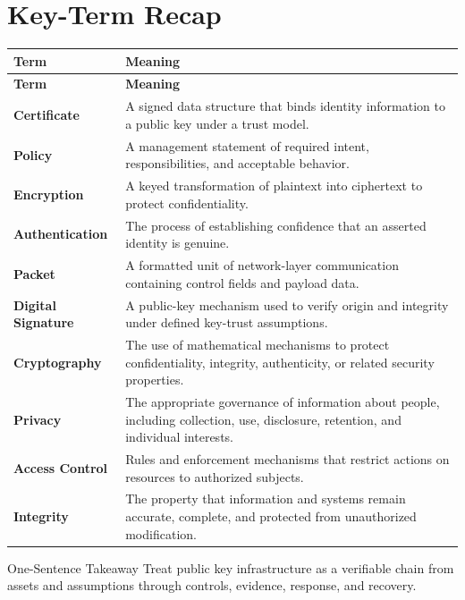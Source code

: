 \documentclass[11pt,letterpaper]{article}
\begin{document}
\section*{Key-Term Recap}
\begin{longtable}{>{\raggedright\arraybackslash}p{}>{\raggedright\arraybackslash}p{}}
\toprule\rowcolor{Navy}\color{white}\textbf{Term} & \color{white}\textbf{Meaning}\\\midrule
\endfirsthead
\toprule\rowcolor{Navy}\color{white}\textbf{Term} & \color{white}\textbf{Meaning}\\\midrule
\endhead
\textbf{Certificate} & A signed data structure that binds identity information to a public key under a trust model. \\\midrule
\textbf{Policy} & A management statement of required intent, responsibilities, and acceptable behavior. \\\midrule
\textbf{Encryption} & A keyed transformation of plaintext into ciphertext to protect confidentiality. \\\midrule
\textbf{Authentication} & The process of establishing confidence that an asserted identity is genuine. \\\midrule
\textbf{Packet} & A formatted unit of network-layer communication containing control fields and payload data. \\\midrule
\textbf{Digital Signature} & A public-key mechanism used to verify origin and integrity under defined key-trust assumptions. \\\midrule
\textbf{Cryptography} & The use of mathematical mechanisms to protect confidentiality, integrity, authenticity, or related security properties. \\\midrule
\textbf{Privacy} & The appropriate governance of information about people, including collection, use, disclosure, retention, and individual interests. \\\midrule
\textbf{Access Control} & Rules and enforcement mechanisms that restrict actions on resources to authorized subjects. \\\midrule
\textbf{Integrity} & The property that information and systems remain accurate, complete, and protected from unauthorized modification. \\\midrule
\bottomrule
\end{longtable}
\begin{CornellExamBox}{One-Sentence Takeaway}
Treat public key infrastructure as a verifiable chain from assets and assumptions through controls, evidence, response, and recovery.
\end{CornellExamBox}
\end{document}
